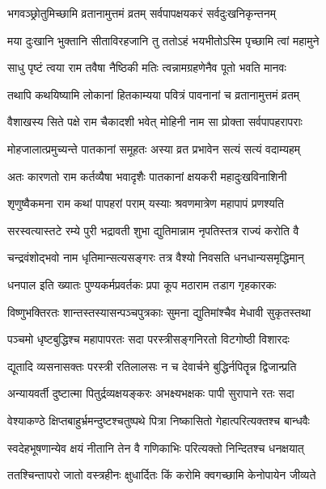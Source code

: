 
\twolineshloka
{भगवञ्छ्रोतुमिच्छामि व्रतानामुत्तमं व्रतम्}
{सर्वपापक्षयकरं सर्वदुःखनिकृन्तनम्}%

\twolineshloka
{मया दुःखानि भुक्तानि सीताविरहजानि तु}
{ततोऽहं भयभीतोऽस्मि पृच्छामि त्वां महामुने}%


\twolineshloka
{साधु पृष्टं त्वया राम तवैषा नैष्ठिकी मतिः}
{त्वन्नामग्रहणेनैव पूतो भवति मानवः}%

\twolineshloka
{तथापि कथयिष्यामि लोकानां हितकाम्यया}
{पवित्रं पावनानां च व्रतानामुत्तमं व्रतम्}%

\twolineshloka
{वैशाखस्य सिते पक्षे राम चैकादशी भवेत्}
{मोहिनी नाम सा प्रोक्ता सर्वपापहरापराः}%

\twolineshloka
{मोहजालात्प्रमुच्यन्ते पातकानां समूहतः}
{अस्या व्रत प्रभावेन सत्यं सत्यं वदाम्यहम्}%

\twolineshloka
{अतः कारणतो राम कर्तव्यैषा भवादृशैः}
{पातकानां क्षयकरी महादुःखविनाशिनी}%

\twolineshloka
{शृणुष्वैकमना राम कथां पापहरां पराम्}
{यस्याः श्रवणमात्रेण महापापं प्रणश्यति}%

\twolineshloka
{सरस्वत्यास्तटे रम्ये पुरी भद्रावती शुभा}
{द्युतिमान्नाम नृपतिस्तत्र राज्यं करोति वै}%

\twolineshloka
{चन्द्रवंशोद्भवो नाम धृतिमान्सत्यसङ्गरः}
{तत्र वैश्यो निवसति धनधान्यसमृद्धिमान्}%

\twolineshloka
{धनपाल इति ख्यातः पुण्यकर्मप्रवर्तकः}
{प्रपा कूप मठाराम तडाग गृहकारकः}%

\twolineshloka
{विष्णुभक्तिरतः शान्तस्तस्यासन्पञ्चपुत्रकाः}
{सुमना द्युतिमांश्चैव मेधावी सुकृतस्तथा}%

\twolineshloka
{पञ्चमो धृष्टबुद्धिश्च महापापरतः सदा}
{परस्त्रीसङ्गनिरतो विटगोष्ठी विशारदः}%

\twolineshloka
{द्यूतादि व्यसनासक्तः परस्त्री रतिलालसः}
{न च देवार्चने बुद्धिर्नपितॄन्न द्विजान्प्रति}%

\twolineshloka
{अन्यायवर्ती दुष्टात्मा पितुर्द्रव्यक्षयङ्करः}
{अभक्ष्यभक्षकः पापी सुरापाने रतः सदा}%

\twolineshloka
{वेश्याकण्ठे क्षिप्तबाहुर्भ्रमन्दुष्टश्चतुष्पथे}
{पित्रा निष्कासितो गेहात्परित्यक्तश्च बान्धवैः}%

\twolineshloka
{स्वदेहभूषणान्येव क्षयं नीतानि तेन वै}
{गणिकाभिः परित्यक्तो निन्दितश्च धनक्षयात्}%

\twolineshloka
{ततश्चिन्तापरो जातो वस्त्रहीनः क्षुधार्दितः}
{किं करोमि क्वगच्छामि केनोपायेन जीव्यते}%

